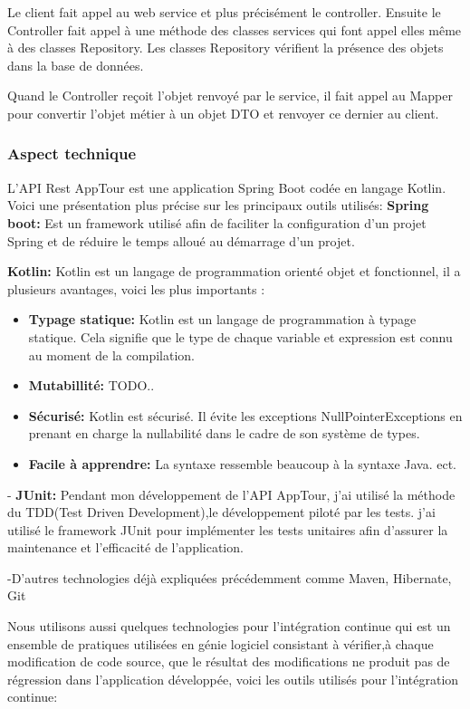\documentclass[12pt]{article}
\begin{document}
	Le client fait appel au web service et plus précisément le controller. Ensuite le Controller fait appel à une méthode des classes services qui font appel elles même à des classes Repository. Les classes Repository vérifient la présence des objets dans la base de données.
	
	Quand le Controller reçoit l'objet renvoyé par le service, il fait appel au Mapper pour convertir l'objet métier à un objet DTO et renvoyer ce dernier au client.  

\subsubsection{Aspect technique}

L'API Rest AppTour est une application Spring Boot codée en langage Kotlin. Voici une présentation plus précise sur les principaux  
outils utilisés: 
\textbf{Spring boot:} Est un framework utilisé afin de faciliter la configuration d'un projet Spring et de réduire le temps alloué au démarrage d'un projet.

\textbf{Kotlin:} Kotlin est un langage de programmation orienté objet et fonctionnel, il a plusieurs avantages, voici les plus importants :
\begin{itemize}
\item \textbf{Typage statique: } Kotlin est un langage de programmation à typage statique. Cela signifie que le type de chaque variable et expression est connu au moment de la compilation.
\item \textbf{Mutabillité: } TODO..
\item \textbf{Sécurisé: } Kotlin est sécurisé. Il évite les exceptions NullPointerExceptions en prenant en charge la nullabilité dans le cadre de son système de types.
\item \textbf{Facile à apprendre: } La syntaxe ressemble beaucoup à la syntaxe Java.
ect.
\end{itemize} 

- \textbf{JUnit:} Pendant mon développement de l'API AppTour, j'ai utilisé la méthode du TDD(Test Driven Development),le développement piloté par les tests. j'ai utilisé le framework JUnit pour implémenter les tests unitaires afin d'assurer la maintenance et l'efficacité de l’application.

-D'autres technologies déjà expliquées précédemment comme Maven, Hibernate, Git

Nous utilisons aussi quelques technologies pour l'intégration continue qui est un ensemble de pratiques utilisées en génie logiciel consistant à vérifier,à chaque modification de code source, que le résultat des modifications ne produit pas de régression dans l’application développée, voici les outils utilisés pour l'intégration continue: 
\end{document}
